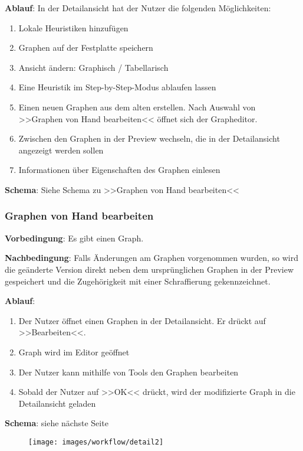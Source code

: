 \documentclass{article}
\begin{document}
	\textbf{Ablauf}:
	In der Detailansicht hat der Nutzer die folgenden Möglichkeiten:
	\begin{enumerate}[1)]
		\item{Lokale Heuristiken hinzufügen}
		\item{Graphen auf der Festplatte speichern}
		\item{Ansicht ändern: Graphisch / Tabellarisch}
		\item{Eine Heuristik im Step-by-Step-Modus ablaufen lassen}
		\item{Einen neuen Graphen aus dem alten erstellen. Nach Auswahl von >>Graphen von Hand bearbeiten<< öffnet sich der Grapheditor.}
		\item{Zwischen den Graphen in der Preview wechseln, die in der Detailansicht angezeigt werden sollen}
		\item{Informationen über Eigenschaften des Graphen einlesen}
	\end{enumerate}
	
	\textbf{Schema}: Siehe Schema zu >>Graphen von Hand bearbeiten<<
	
	
	\subsubsection{Graphen von Hand bearbeiten}
	\textbf{Vorbedingung}: Es gibt einen Graph.
	
	\textbf{Nachbedingung}: Falls Änderungen am Graphen vorgenommen wurden, so wird die geänderte Version direkt neben dem ursprünglichen Graphen in der Preview gespeichert und die Zugehörigkeit mit einer Schraffierung gekennzeichnet.
	
	\textbf{Ablauf}:
	\begin{enumerate}[1)]
		\item{Der Nutzer öffnet einen Graphen in der Detailansicht. Er drückt auf >>Bearbeiten<<.}
		\item{Graph wird im Editor geöffnet}
		\item{Der Nutzer kann mithilfe von Tools den Graphen bearbeiten}
		\item{Sobald der Nutzer auf >>OK<< drückt, wird der modifizierte Graph in die Detailansicht geladen}
	\end{enumerate}
	
	\textbf{Schema}: siehe nächste Seite
	~\begin{figure}[!h]
		\centering
		\texttt{[image: images/workflow/detail2]}
	\end{figure}
	
\end{document}
